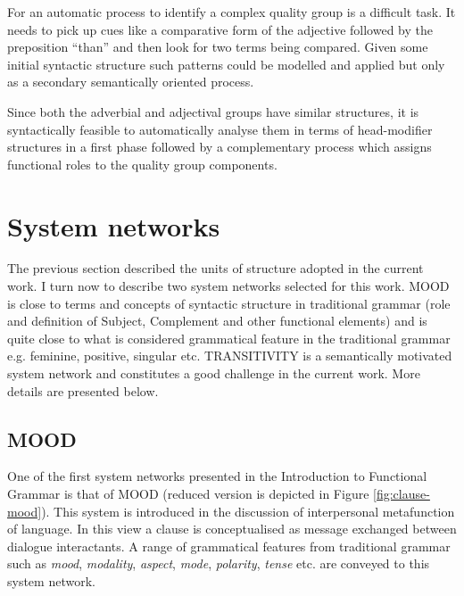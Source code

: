 	For an automatic process to identify a complex quality group is a difficult task. It needs to pick up cues like a comparative form of the adjective followed by the preposition ``than'' and then look for two terms being compared. Given some initial syntactic structure such patterns could be modelled and applied but only as a secondary semantically oriented process.
	
	Since both the adverbial and adjectival groups have similar structures, it is syntactically feasible to automatically analyse them in terms of head-modifier structures in a first phase followed by a complementary process which assigns functional roles to the quality group components.

\section{System networks}
    The previous section described the units of structure adopted in the current work. I turn now to describe two system networks selected for this work. MOOD is close to terms and concepts of syntactic structure in traditional grammar (role and definition of Subject, Complement and other functional elements) and is quite close to what is considered grammatical feature in the traditional grammar e.g. feminine, positive, singular etc. TRANSITIVITY is a semantically motivated system network and constitutes a good challenge in the current work. More details are presented below.

    
    
\subsection{MOOD}
\label{sec:mood}

    One of the first system networks presented in the Introduction to Functional Grammar \citep{Halliday2013} is that of MOOD (reduced version is depicted in Figure \ref{fig:clause-mood}). 
    This system is introduced in the discussion of interpersonal metafunction of language. In this view a clause is conceptualised as message exchanged between dialogue interactants. A range of grammatical features from traditional grammar such as \textit{mood}, \textit{modality}, \textit{aspect}, \textit{mode}, \textit{polarity}, \textit{tense} etc. are conveyed to this system network. 
    
